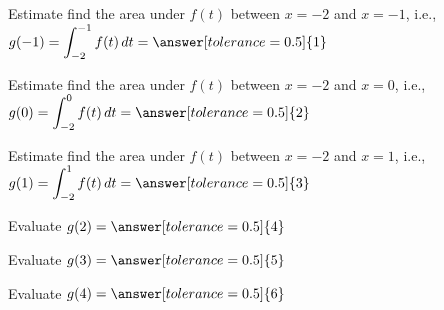 \documentclass{ximera}
\begin{document}
\begin{problem}
Estimate find the area under $f(t)$ between $x=-2$ and $x=-1$, i.e., $\displaystyle g(-1)=\int_{-2}^{-1}{f(t)\,dt}=\answer[tolerance=0.5]{1}$
\begin{problem}
Estimate find the area under $f(t)$ between $x=-2$ and $x=0$, i.e., $\displaystyle g(0)=\int_{-2}^{0}{f(t)\,dt}=\answer[tolerance=0.5]{2}$
\begin{problem}
Estimate find the area under $f(t)$ between $x=-2$ and $x=1$, i.e., $\displaystyle g(1)=\int_{-2}^{1}{f(t)\,dt}=\answer[tolerance=0.5]{3}$
\begin{problem}
Evaluate $\displaystyle g(2) = \answer[tolerance=0.5]{4}$
\begin{problem}
Evaluate $\displaystyle g(3) = \answer[tolerance=0.5]{5}$
\begin{problem}
Evaluate $\displaystyle g(4) = \answer[tolerance=0.5]{6}$
\end{problem}
\end{problem}
\end{problem}
\end{problem}
\end{problem}
\end{problem}
\end{document}
